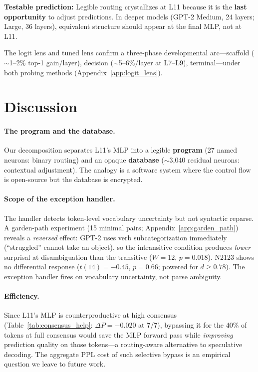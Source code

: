 \documentclass{article}
\begin{document}
\textbf{Testable prediction:} Legible routing crystallizes at L11 because it is
the \textbf{last opportunity} to adjust predictions.
In deeper models (GPT-2 Medium, 24 layers; Large, 36 layers), equivalent
structure should appear at the final MLP, not at L11.

The logit lens and tuned lens \citep{belrose2023eliciting} confirm a three-phase
developmental arc---scaffold ($\sim$1--2\% top-1 gain/layer), decision
($\sim$5--6\%/layer at L7--L9), terminal---under both probing methods
(Appendix~\ref{app:logit_lens}).

\section{Discussion}
\label{sec:discussion}

\paragraph{The program and the database.}
Our decomposition separates L11's MLP into a legible \textbf{program} (27 named
neurons: binary routing) and an opaque \textbf{database} ($\sim$3{,}040 residual
neurons: contextual adjustment).
The analogy is a software system where the control flow is open-source but the
database is encrypted.

\paragraph{Scope of the exception handler.}
\label{sec:garden_path}
The handler detects token-level vocabulary uncertainty but not syntactic reparse.
A garden-path experiment (15 minimal pairs; Appendix~\ref{app:garden_path})
reveals a \emph{reversed} effect: GPT-2 uses verb subcategorization immediately
(``struggled'' cannot take an object), so the intransitive condition produces
\emph{lower} surprisal at disambiguation than the transitive
($W = 12$, $p = 0.018$).
N2123 shows no differential response ($t(14) = -0.45$, $p = 0.66$;
powered for $d \geq 0.78$).
The exception handler fires on vocabulary uncertainty, not parse ambiguity.

\paragraph{Efficiency.}
Since L11's MLP is counterproductive at high consensus
(Table~\ref{tab:consensus_help}: $\Delta P = -0.020$ at 7/7), bypassing it
for the 40\% of tokens at full consensus would save the MLP forward pass
while \emph{improving} prediction quality on those tokens---a routing-aware
alternative to speculative decoding.
The aggregate PPL cost of such selective bypass is an empirical question we
leave to future work.
\end{document}
